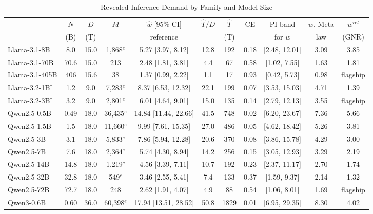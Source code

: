 \begin{table}[htbp]
\centering
\scriptsize
\begin{threeparttable}
\caption{Revealed Inference Demand by Family and Model Size}
\label{tab:m3_table5}
\begin{tabular}{@{}lcccccccccc@{}}
\toprule
 & $N$ & $D$ & $M$ & $\hat w$ [95\% CI] & $\hat T/D$ & $\hat T$ & CE & PI band & $w$, Meta & $w^{rel}$ \\
 & (B) & (T) & & reference & & (T) & & for $w$ & law & (GNR) \\
\midrule
Llama-3.1-8B & 8.0 & 15.0 & 1,868$^{e}$ & 5.27 [3.97, 8.12] & 12.8 & 192 & 0.18 & [2.48, 12.01] & 3.09 & 3.85 \\
Llama-3.1-70B & 70.6 & 15.0 & 213 & 2.48 [1.81, 3.81] & 4.4 & 67 & 0.58 & [1.02, 7.55] & 1.63 & 1.81 \\
Llama-3.1-405B & 406 & 15.6 & 38 & 1.37 [0.99, 2.22] & 1.1 & 17 & 0.93 & [0.42, 5.73] & 0.98 & flagship \\
\addlinespace
Llama-3.2-1B$^{\dagger}$ & 1.2 & 9.0 & 7,283$^{e}$ & 8.37 [6.53, 12.32] & 22.1 & 199 & 0.07 & [3.53, 15.03] & 4.71 & 1.39 \\
Llama-3.2-3B$^{\dagger}$ & 3.2 & 9.0 & 2,801$^{e}$ & 6.01 [4.64, 9.01] & 15.0 & 135 & 0.14 & [2.79, 12.13] & 3.55 & flagship \\
\addlinespace
Qwen2.5-0.5B & 0.49 & 18.0 & 36,435$^{e}$ & 14.84 [11.44, 22.66] & 41.5 & 748 & 0.02 & [6.20, 23.67] & 7.36 & 5.66 \\
Qwen2.5-1.5B & 1.5 & 18.0 & 11,660$^{e}$ & 9.99 [7.61, 15.35] & 27.0 & 486 & 0.05 & [4.62, 18.42] & 5.26 & 3.81 \\
Qwen2.5-3B & 3.1 & 18.0 & 5,833$^{e}$ & 7.86 [5.94, 12.28] & 20.6 & 370 & 0.08 & [3.86, 15.78] & 4.29 & 3.00 \\
Qwen2.5-7B & 7.6 & 18.0 & 2,364$^{e}$ & 5.74 [4.30, 8.94] & 14.2 & 256 & 0.15 & [3.05, 12.93] & 3.29 & 2.19 \\
Qwen2.5-14B & 14.8 & 18.0 & 1,219$^{c}$ & 4.56 [3.39, 7.11] & 10.7 & 192 & 0.23 & [2.37, 11.17] & 2.70 & 1.74 \\
Qwen2.5-32B & 32.8 & 18.0 & 549$^{c}$ & 3.46 [2.55, 5.41] & 7.4 & 133 & 0.37 & [1.59, 9.37] & 2.14 & 1.32 \\
Qwen2.5-72B & 72.7 & 18.0 & 248 & 2.62 [1.91, 4.07] & 4.9 & 88 & 0.54 & [1.06, 8.01] & 1.69 & flagship \\
\addlinespace
Qwen3-0.6B & 0.60 & 36.0 & 60,398$^{e}$ & 17.94 [13.51, 28.52] & 50.8 & 1829 & 0.01 & [6.95, 29.35] & 8.30 & 4.02 \\

\end{tabular}
\end{threeparttable}
\end{table}
